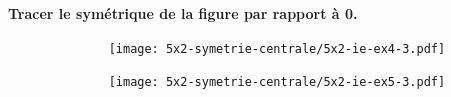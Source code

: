 \textbf{Tracer le symétrique de la figure par rapport à 0.}

\begin{multicols}{2}

  \begin{figure}[H]
        \centering
        \texttt{[image: 5x2-symetrie-centrale/5x2-ie-ex4-3.pdf]}
  \end{figure}

  \begin{figure}[H]
        \centering
        \texttt{[image: 5x2-symetrie-centrale/5x2-ie-ex5-3.pdf]}
  \end{figure}

\end{multicols}

